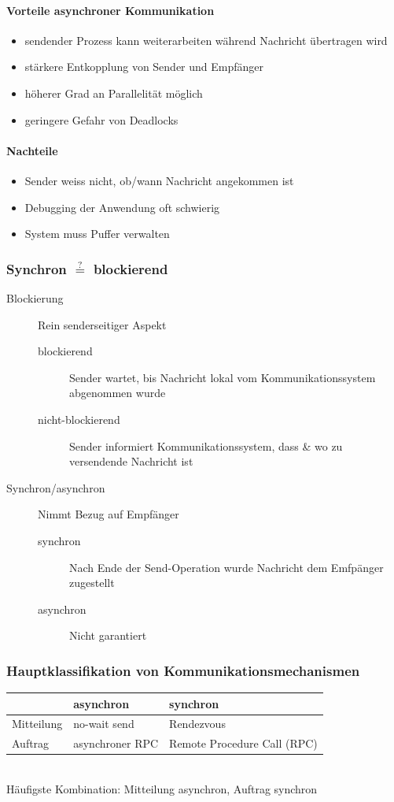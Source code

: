 \documentclass[10pt,a4paper]{article}
\begin{document}
\paragraph{Vorteile asynchroner Kommunikation}
\begin{itemize}[topsep=-100ex]
\item sendender Prozess kann weiterarbeiten während Nachricht übertragen wird
\item stärkere Entkopplung von Sender und Empfänger
\item höherer Grad an Parallelität möglich
\item geringere Gefahr von Deadlocks
\end{itemize}
\paragraph{Nachteile}
\begin{itemize}[topsep=-100ex]
\item Sender weiss nicht, ob/wann Nachricht angekommen ist
\item Debugging der Anwendung oft schwierig
\item System muss Puffer verwalten
\end{itemize}

\subsubsection{Synchron $\stackrel{?}{=}$ blockierend}
\begin{description}
\item[Blockierung] Rein senderseitiger Aspekt
\begin{description}
\item[blockierend] Sender wartet, bis Nachricht lokal vom Kommunikationssystem abgenommen wurde
\item[nicht-blockierend]Sender informiert Kommunikationssystem, dass \& wo zu versendende Nachricht ist
\end{description}
\item[Synchron/asynchron] Nimmt Bezug auf Empfänger
\begin{description}
\item[synchron] Nach Ende der Send-Operation wurde Nachricht dem Emfpänger zugestellt
\item[asynchron] Nicht garantiert
\end{description}
\end{description}

\subsubsection{Hauptklassifikation von Kommunikationsmechanismen}
\begin{tabular}{l || l | l}
 & asynchron & synchron\\
 \hline \hline
 Mitteilung & no-wait send & Rendezvous\\
 \hline
 Auftrag & asynchroner RPC & Remote Procedure Call (RPC)
\end{tabular}
\linebreak\\
Häufigste Kombination: Mitteilung asynchron, Auftrag synchron
\end{document}
